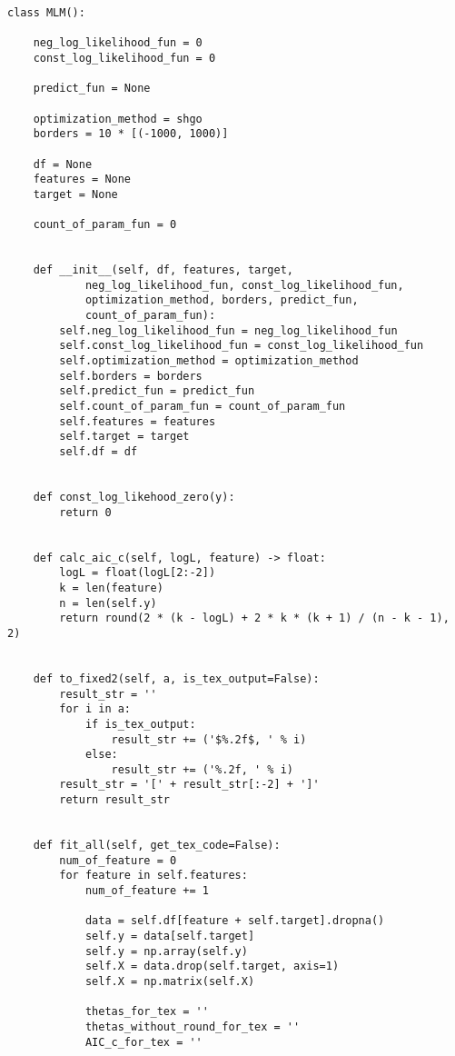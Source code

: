 \begin{verbatim}
class MLM():

    neg_log_likelihood_fun = 0
    const_log_likelihood_fun = 0
    
    predict_fun = None
    
    optimization_method = shgo
    borders = 10 * [(-1000, 1000)]
    
    df = None
    features = None
    target = None
    
    count_of_param_fun = 0
    
    
    def __init__(self, df, features, target,
            neg_log_likelihood_fun, const_log_likelihood_fun,
            optimization_method, borders, predict_fun,
            count_of_param_fun):
        self.neg_log_likelihood_fun = neg_log_likelihood_fun
        self.const_log_likelihood_fun = const_log_likelihood_fun
        self.optimization_method = optimization_method
        self.borders = borders
        self.predict_fun = predict_fun
        self.count_of_param_fun = count_of_param_fun
        self.features = features
        self.target = target
        self.df = df
    
    
    def const_log_likehood_zero(y):
        return 0
    
    
    def calc_aic_c(self, logL, feature) -> float:
        logL = float(logL[2:-2])
        k = len(feature)
        n = len(self.y)
        return round(2 * (k - logL) + 2 * k * (k + 1) / (n - k - 1), 2)
    
    
    def to_fixed2(self, a, is_tex_output=False):
        result_str = ''
        for i in a:
            if is_tex_output:
                result_str += ('$%.2f$, ' % i)
            else:
                result_str += ('%.2f, ' % i)
        result_str = '[' + result_str[:-2] + ']'
        return result_str
    
    
    def fit_all(self, get_tex_code=False):
        num_of_feature = 0
        for feature in self.features:
            num_of_feature += 1
    
            data = self.df[feature + self.target].dropna()
            self.y = data[self.target]
            self.y = np.array(self.y)
            self.X = data.drop(self.target, axis=1)
            self.X = np.matrix(self.X)
            
            thetas_for_tex = ''
            thetas_without_round_for_tex = ''
            AIC_c_for_tex = ''
            

\end{verbatim}
